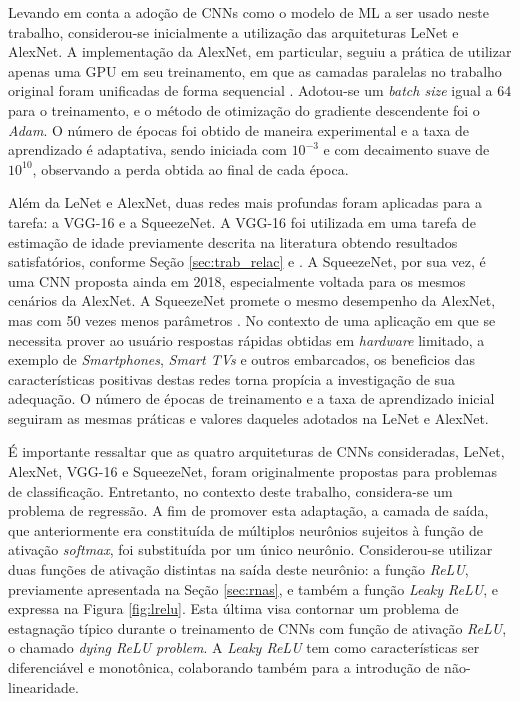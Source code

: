 Levando em conta a adoção de CNNs como o modelo de ML a ser usado neste trabalho, considerou-se inicialmente a utilização das arquiteturas LeNet e AlexNet. A implementação da AlexNet, em particular, seguiu a prática de utilizar apenas uma GPU em seu treinamento, em que as camadas paralelas no trabalho original foram unificadas de forma sequencial \cite{tensorflow:alexnet}. Adotou-se um \emph{batch size} igual a $64$ para o treinamento, e o método de otimização do gradiente descendente foi o \emph{Adam}. O número de épocas foi obtido de maneira experimental e a taxa de aprendizado é adaptativa, sendo iniciada com $10^{-3}$ e com decaimento suave de $10^{10}$, observando a perda obtida ao final de cada época.

Além da LeNet e AlexNet, duas redes mais profundas foram aplicadas para a tarefa: a VGG-16 e a SqueezeNet. A VGG-16 foi utilizada em uma tarefa de estimação de idade previamente descrita na literatura obtendo resultados satisfatórios, conforme Seção \ref{sec:trab_relac} e  \cite{rothe2015dex}. A SqueezeNet, por sua vez, é uma CNN proposta ainda em 2018, especialmente voltada para os mesmos cenários da AlexNet. A SqueezeNet promete o mesmo desempenho da AlexNet, mas com 50 vezes menos parâmetros \cite{squeezenet}. No contexto de uma aplicação em que se necessita prover ao usuário respostas rápidas obtidas em \emph{hardware} limitado, a exemplo de \emph{Smartphones}, \emph{Smart TVs} e outros embarcados, os beneficios das características positivas destas redes torna propícia a investigação de sua adequação. O número de épocas de treinamento e a taxa de aprendizado inicial seguiram as mesmas práticas e valores daqueles adotados na LeNet e AlexNet.

É importante ressaltar que as quatro arquiteturas de CNNs consideradas, LeNet, AlexNet, VGG-16 e SqueezeNet, foram originalmente propostas para problemas de classificação. Entretanto, no contexto deste trabalho, considera-se um problema de regressão. A fim de promover esta adaptação, a camada de saída, que anteriormente era constituída de múltiplos neurônios sujeitos à função de ativação \emph{softmax}, foi substituída por um único neurônio. Considerou-se utilizar duas funções de ativação distintas na saída deste neurônio: a função \emph{ReLU}, previamente apresentada na Seção \ref{sec:rnas}, e também a função \emph{Leaky ReLU}, e expressa na Figura \ref{fig:lrelu}. Esta última visa contornar um problema de estagnação típico durante o treinamento de CNNs com  função de ativação \emph{ReLU}, o chamado \emph{dying ReLU problem}. A \emph{Leaky ReLU} tem como características ser diferenciável e monotônica, colaborando também para a introdução de não-linearidade.


